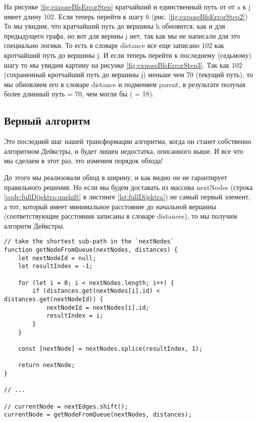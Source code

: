 \documentclass[../article.tex]{subfiles}
\begin{document}
На рисунке \ref{fig:exposeBfsErrorStep} кратчайший и единственный путь от от {\firacodebold a} к {\firacodebold j} имеет длину 102. Если теперь перейти к шагу 6 (рис. \ref{fig:exposeBfsErrorStep2}) То мы увидим, что кратчайший путь до вершины {\firacodebold h} обновится, как и для предыдущего графа, но вот для верины {\firacodebold j} нет, так как мы не написали для это специально логики. То есть в словаре distance все еще записано 102 как кротчайший путь до вершины {\firacodebold j}. И если теперь перейти к последнему (седьмому) шагу то мы увидим картину на рисунке \ref{fig:exposeBfsErrorStep3}. Так как 102 (сохраненный кротчайший путь до вершины j) меньше чем 70 (текущий путь), то мы обновляем его в словаре distance и подменяем {\firacodebold parent}, в результате получая более длинный путь {\firacodebold [j, i, g, f, a]} = 70, чем могли бы ({\firacodebold [j, h, ,g, f, a]} = 18).

\subsection{Верный алгоритм}

Это последний шаг нашей трансформации алгоритма, когда он станет собственно алгоритмом Дейкстры, и будет лишен недостатка, описанного выше. И все что мы сделаем в этот раз, это изменим порядок обхода!

До этого мы реализовали обход в ширину, и как видно он не гарантирует правильного решения. Но если мы будем доставать из массива {\firacodebold nextNodes} (строка \ref{code:fullDijsktra:unshift} в листинге \ref{lst:fullDijsktra}) не самый первый элемент, а тот, который имеет минимальное расстояние до начальной вершины (соответствующие расстояния записаны в словаре {\firacodebold distances}), то мы получим алгоритм Дейкстры.

\begin{figure*}
    \begin{ruledelement}
        \begin{lstlisting}[caption={Отличие алгоритма дейкстры}, label={lst:dijkstraDiffBfs}]
// take the shortest sub-path in the `nextNodes`
function getNodeFromQueue(nextNodes, distances) {
    let nextNodeId = null;
    let resultIndex = -1;

    for (let i = 0; i < nextNodes.length; i++) {
        if (distances.get(nextNodes[i].id) < distances.get(nextNodeId)) {
            nextNodeId = nextNodes[i].id;
            resultIndex = i;
        }
    }

    const [nextNode] = nextNodes.splice(resultIndex, 1);

    return nextNode;
}

// ...

// currentNode = nextEdges.shift();
currentNode = getNodeFromQueue(nextNodes, distances);
        \end{lstlisting}
    \end{ruledelement}
\end{figure*}
\end{document}
